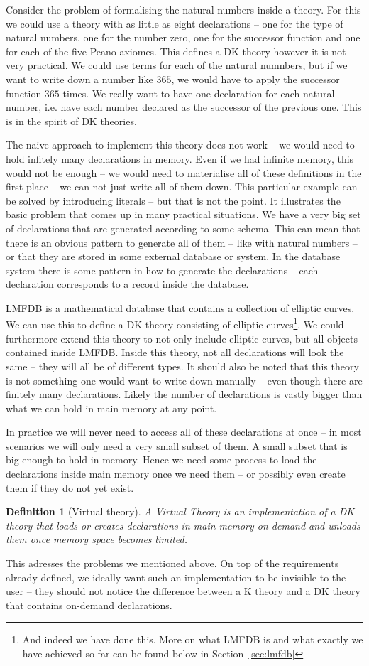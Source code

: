 \documentclass{deliverablereport}
\newtheorem{mydef}{Definition}
\begin{document}
Consider the problem of formalising the natural numbers inside a theory. For this we could use a theory with as little as eight declarations -- one for the type of natural numbers, one for the number zero, one for the successor function and one for each of the five Peano axiomes. This defines a DK theory however it is not very practical. We could use terms for each of the natural numnbers, but if we want to write down a number like $365$, we would have to apply the successor function $365$ times. We really want to have one declaration for each natural number, i.e. have each number declared as the successor of the previous one. This is in the spirit of DK theories.

The naive approach to implement this theory does not work -- we would need to hold infitely many declarations in memory. Even if we had infinite memory, this would not be enough -- we would need to materialise all of these definitions in the first place -- we can not just write all of them down. This particular example can be solved by introducing literals -- but that is not the point. It illustrates the basic problem that comes up in many practical situations. We have a very big set of declarations that are generated according to some schema. This can mean that there is an obvious pattern to generate all of them -- like with natural numbers -- or that they are stored in some external database or system. In the database system there is some pattern in how to generate the declarations -- each declaration corresponds to a record inside the database.

LMFDB is a mathematical database that contains a collection of elliptic curves. We can use this to define a DK theory consisting of elliptic curves\footnote{And indeed we have done this. More on what LMFDB is and what exactly we have achieved so far can be found below in Section~\ref{sec:lmfdb}}. We could furthermore extend this theory to not only include elliptic curves, but all objects contained inside LMFDB. Inside this theory, not all declarations will look the same -- they will all be of different types. It should also be noted that this theory is not something one would want to write down manually -- even though there are finitely many declarations. Likely the number of declarations is vastly bigger than what we can hold in main memory at any point.

In practice we will never need to access all of these declarations at once -- in most scenarios we will only need a very small subset of them. A small subset that is big enough to hold in memory. Hence we need some process to load the declarations inside main memory once we need them -- or possibly even create them if they do not yet exist.
\begin{mydef}[Virtual theory]
  A Virtual Theory is an implementation of a DK theory that loads or creates declarations in main memory on demand and unloads them once memory space becomes limited.
\end{mydef}
This adresses the problems we mentioned above. On top of the requirements already defined, we ideally want such an implementation to be invisible to the user -- they should not notice the difference between a K theory and a DK theory that contains on-demand declarations.
\end{document}
